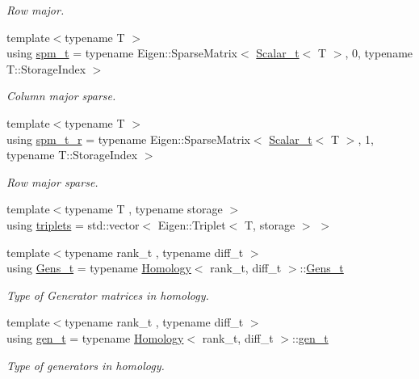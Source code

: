 \begin{DoxyCompactItemize}
\begin{DoxyCompactList}\small\item\em Row major. \end{DoxyCompactList}\item 
{\footnotesize template$<$typename T $>$ }\\using \hyperlink{namespaceMackey_a3f5deb1be99876ac8c7d72f0f0cca3af}{spm\+\_\+t} = typename Eigen\+::\+Sparse\+Matrix$<$ \hyperlink{namespaceMackey_a93ba297573961f91101fb84bc84bbe95}{Scalar\+\_\+t}$<$ T $>$, 0, typename T\+::\+Storage\+Index $>$
\begin{DoxyCompactList}\small\item\em Column major sparse. \end{DoxyCompactList}\item 
{\footnotesize template$<$typename T $>$ }\\using \hyperlink{namespaceMackey_acc7de57bf31af7089e6bc392c8b52e7e}{spm\+\_\+t\+\_\+r} = typename Eigen\+::\+Sparse\+Matrix$<$ \hyperlink{namespaceMackey_a93ba297573961f91101fb84bc84bbe95}{Scalar\+\_\+t}$<$ T $>$, 1, typename T\+::\+Storage\+Index $>$
\begin{DoxyCompactList}\small\item\em Row major sparse. \end{DoxyCompactList}\item 
{\footnotesize template$<$typename T , typename storage $>$ }\\using \hyperlink{namespaceMackey_a0b8cd52f81199d53fa1e93946d8115ef}{triplets} = std\+::vector$<$ Eigen\+::\+Triplet$<$ T, storage $>$ $>$
\item 
{\footnotesize template$<$typename rank\+\_\+t , typename diff\+\_\+t $>$ }\\using \hyperlink{namespaceMackey_ab2542005948b58de00ac4647ca2c7106}{Gens\+\_\+t} = typename \hyperlink{classMackey_1_1Homology}{Homology}$<$ rank\+\_\+t, diff\+\_\+t $>$\+::\hyperlink{namespaceMackey_ab2542005948b58de00ac4647ca2c7106}{Gens\+\_\+t}
\begin{DoxyCompactList}\small\item\em Type of Generator matrices in homology. \end{DoxyCompactList}\item 
{\footnotesize template$<$typename rank\+\_\+t , typename diff\+\_\+t $>$ }\\using \hyperlink{namespaceMackey_a6bb0b2796632ba6c7f8ea192f7aecffe}{gen\+\_\+t} = typename \hyperlink{classMackey_1_1Homology}{Homology}$<$ rank\+\_\+t, diff\+\_\+t $>$\+::\hyperlink{namespaceMackey_a6bb0b2796632ba6c7f8ea192f7aecffe}{gen\+\_\+t}
\begin{DoxyCompactList}\small\item\em Type of generators in homology. \end{DoxyCompactList}\end{DoxyCompactItemize}
